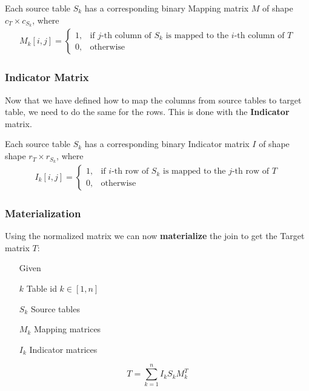 \begin{definition}
    Each source table $S_k$ has a corresponding binary Mapping matrix $M$ of shape $c_T \times c_{S_k}$, where
    \begin{align*}
        M_k[i,j] = \begin{cases}
                       1, & \text{if $j$-th column of $S_k$ is mapped to the $i$-th column of $T$} \\
                       0, & \text{otherwise}
                   \end{cases}
    \end{align*}
\end{definition}


\subsubsection{Indicator Matrix}
Now that we have defined how to map the columns from source tables to target table, we need to do the same for the rows. This is done with the \textbf{Indicator} matrix.

\begin{definition}
    Each source table $S_k$ has a corresponding binary Indicator matrix $I$ of shape shape $r_T \times r_{S_k}$, where
    \begin{align*}
        I_k[i,j] = \begin{cases}
                       1, & \text{if $i$-th row of $S_k$ is mapped to the $j$-th row of $T$} \\
                       0, & \text{otherwise}
                   \end{cases}
    \end{align*}
\end{definition}



\subsubsection{Materialization}
Using the normalized matrix we can now \textbf{materialize} the join to get the Target matrix $T$:

\begin{definition}
    \begin{itemize}
        \item[]
        \item[] Given
        \item[$k$] Table id $k \in [1,n]$
        \item[$S_k$] Source tables
        \item[$M_k$] Mapping matrices
        \item[$I_k$] Indicator matrices
    \end{itemize}
    \[
        T = \sum_{k=1}^{n}  I_k S_k M^T_k
    \]

\end{definition}

